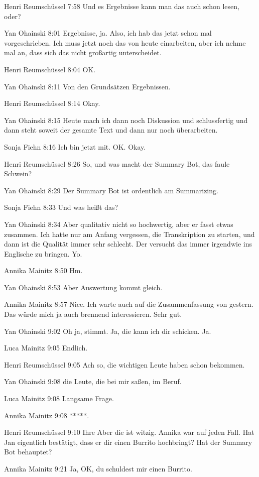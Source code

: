 Henri Reumschüssel   7:58
Und es Ergebnisse kann man das auch schon lesen, oder?

Yan Ohainski   8:01
Ergebnisse, ja.
Also, ich hab das jetzt schon mal vorgeschrieben. Ich muss jetzt noch das von heute einarbeiten, aber ich nehme mal an, dass sich das nicht großartig unterscheidet.

Henri Reumschüssel   8:04
OK.

Yan Ohainski   8:11
Von den Grundsätzen Ergebnissen.

Henri Reumschüssel   8:14
Okay.

Yan Ohainski   8:15
Heute mach ich dann noch Diskussion und schlussfertig und dann steht soweit der gesamte Text und dann nur noch überarbeiten.

Sonja Fiehn   8:16
Ich bin jetzt mit.
OK.
Okay.

Henri Reumschüssel   8:26
So, und was macht der Summary Bot, das faule Schwein?

Yan Ohainski   8:29
Der Summary Bot ist ordentlich am Summarizing.

Sonja Fiehn   8:33
Und was heißt das?

Yan Ohainski   8:34
Aber qualitativ nicht so hochwertig, aber er fasst etwas zusammen.
Ich hatte nur am Anfang vergessen, die Transkription zu starten, und dann ist die Qualität immer sehr schlecht. Der versucht das immer irgendwie ins Englische zu bringen.
Yo.

Annika Mainitz   8:50
Hm.

Yan Ohainski   8:53
Aber Auswertung kommt gleich.

Annika Mainitz   8:57
Nice.
Ich warte auch auf die Zusammenfassung von gestern. Das würde mich ja auch brennend interessieren. Sehr gut.

Yan Ohainski   9:02
Oh ja, stimmt. Ja, die kann ich dir schicken.
Ja.

Luca Mainitz   9:05
Endlich.

Henri Reumschüssel   9:05
Ach so, die wichtigen Leute haben schon bekommen.

Yan Ohainski   9:08
die Leute, die bei mir saßen, im Beruf.

Luca Mainitz   9:08
Langsame Frage.

Annika Mainitz   9:08
*****.

Henri Reumschüssel   9:10
Ihre
Aber die ist witzig. Annika war auf jeden Fall. Hat Jan eigentlich bestätigt, dass er dir einen Burrito hochbringt? Hat der Summary Bot behauptet?

Annika Mainitz   9:21
Ja, OK, du schuldest mir einen Burrito.

